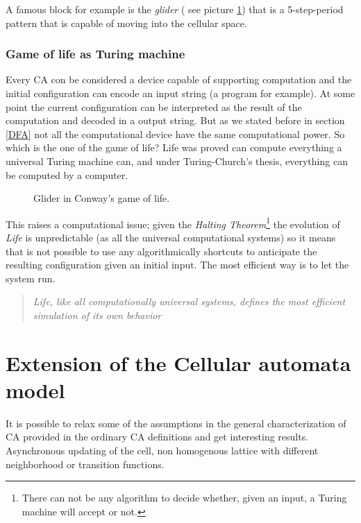 A famous block for example is the \emph{glider} ( see picture \ref{fig:glider}) that
is a 5-step-period pattern that is capable of moving into the cellular space.

\subsubsection{Game of life as Turing machine}
Every CA con be considered a device capable of supporting computation and the
initial configuration can encode an input string (a program for example). At
some point the current configuration can be interpreted as the result of the
computation and decoded in a output string. But as we stated before in section
\ref{DFA} not all the computational device have the same computational power. So
which is the one of the game of life? Life was proved can compute everything a
universal Turing machine can, and under Turing-Church's thesis, everything can
be computed by a computer\cite{berlekamp1982}.
\begin{figure}
\centering
\caption{Glider in Conway's game of life.}
\label{fig:glider}
\setlength{\fboxrule}{1pt}%
\end{figure}



This raises a computational issue; given the \emph{Halting
Theorem}\footnote{There can not be any algorithm to decide whether, given an
input, a Turing machine will accept or not.} the evolution of \emph{Life} is
unpredictable (as all the universal computational systems) so it means that is
not possible to use any algorithmically shortcuts to anticipate the resulting
configuration given an initial input. The most efficient way is to let the
system run.

\begin{quotation}
\em Life, like all computationally universal systems, defines the most efficient
simulation of its own behavior\cite{Ilachinski2001}
\end{quotation}





\section{Extension of the Cellular automata model}
It is possible to relax some of the assumptions in the general characterization
of CA provided in the ordinary CA definitions and get interesting results.
Asynchronous updating of the cell, non homogenous lattice with different
neighborhood or transition functions.

